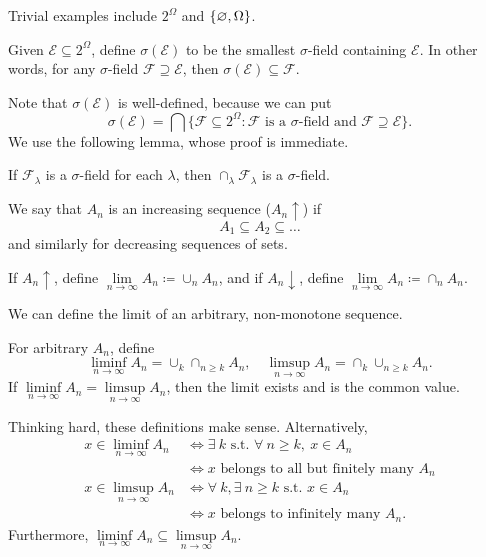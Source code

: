 Trivial examples include $2^{\Omega}$ and $\{\varnothing,\Omega\}$. 

\begin{definition}
	Given $\mathscr{E} \subseteq 2^{\Omega}$, define $\sigma(\mathscr{E})$ to be the smallest $\sigma$-field containing $\mathscr{E}$. In other words, for any $\sigma$-field $\mathscr{F} \supseteq \mathscr{E}$, then $\sigma(\mathscr{E}) \subseteq \mathscr{F}$.

	Note that $\sigma(\mathscr{E})$ is well-defined, because we can put \[
		\sigma(\mathscr{E}) = \bigcap \{\mathscr{F} \subseteq 2^{\Omega}: \mathscr{F} \text{ is a } \sigma\text{-field and } \mathscr{F} \supseteq \mathscr{E}\}
	.\] We use the following lemma, whose proof is immediate.
\end{definition}

\begin{lemma}
	If $\mathscr{F}_\lambda$ is a $\sigma$-field for each $\lambda$, then $\cap_\lambda \mathscr{F}_\lambda$ is a $\sigma$-field.
\end{lemma}

\begin{definition}
	We say that $A_n$ is an increasing sequence ($A_n \uparrow$) if \[
		A_1 \subseteq A_2 \subseteq \ldots
	\] and similarly for decreasing sequences of sets.

	If $A_n \uparrow$, define $\lim\limits_{n \to \infty} A_n \coloneqq \cup_n A_n$, and if $A_n \downarrow$, define $\lim\limits_{n \to \infty} A_n \coloneqq \cap_n A_n$.
\end{definition}

We can define the limit of an arbitrary, non-monotone sequence.

\begin{definition}
	For arbitrary $A_n$, define \[
		\liminf\limits_{n \to \infty} A_n = \cup_k \cap_{n \ge k} A_n, \quad \limsup\limits_{n \to \infty} A_n = \cap_k \cup_{n \ge k} A_n
	.\] If $\liminf\limits_{n \to \infty} A_n = \limsup\limits_{n \to \infty} A_n$, then the limit exists and is the common value.
\end{definition}

\begin{remark}
	Thinking hard, these definitions make sense. Alternatively, 
	\begin{align*}
		x \in \liminf\limits_{n \to \infty} A_n &\iff \exists\ k \text{ s.t. } \forall\ n \ge k ,\  x\in A_n \\
												&\iff x \text{ belongs to all but finitely many } A_n \\
		x \in \limsup_{n \to \infty} A_n &\iff \forall\ k, \exists\ n \ge k \text{ s.t. } x \in A_n \\
										 &\iff x \text{ belongs to infinitely many } A_n
	.\end{align*}
	Furthermore, $\liminf\limits_{n \to \infty} A_n \subseteq \limsup\limits_{n \to \infty} A_n$.
\end{remark}

